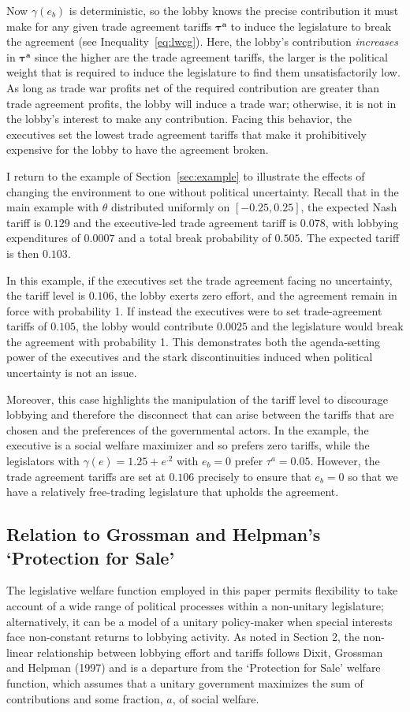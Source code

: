 \documentclass[10pt]{article}
\newcommand{\ve}{\theta}
\newcommand{\bta}{\bm{\tau^a}}
\newcommand{\ga}{\gamma}
\begin{document}
Now $\ga(e_b)$ is deterministic, so the lobby knows the precise contribution it must make for any given trade agreement tariffs $\bta$ to induce the legislature to break the agreement (see Inequality~\ref{eq:lwcg}). Here, the lobby's contribution \textit{increases} in $\bta$ since the higher are the trade agreement tariffs, the larger is the political weight that is required to induce the legislature to find them unsatisfactorily low. As long as trade war profits net of the required contribution are greater than trade agreement profits, the lobby will induce a trade war; otherwise, it is not in the lobby's interest to make any contribution. Facing this behavior, the executives set the lowest trade agreement tariffs that make it prohibitively expensive for the lobby to have the agreement broken.

I return to the example of Section~\ref{sec:example} to illustrate the effects of changing the environment to one without political uncertainty. Recall that in the main example with $\ve$ distributed uniformly on $[-0.25,0.25]$, the expected Nash tariff is $0.129$ and the executive-led trade agreement tariff is $0.078$, with lobbying expenditures of $0.0007$ and a total break probability of $0.505$. The expected tariff is then $0.103$.

In this example, if the executives set the trade agreement facing no uncertainty, the tariff level is $0.106$, the lobby exerts zero effort, and the agreement remain in force with probability 1. If instead the executives were to set trade-agreement tariffs of $0.105$, the lobby would contribute $0.0025$ and the legislature would break the agreement with probability 1. This demonstrates both the agenda-setting power of the executives and the stark discontinuities induced when political uncertainty is not an issue.

Moreover, this case highlights the manipulation of the tariff level to discourage lobbying and therefore the disconnect that can arise between the tariffs that are chosen and the preferences of the governmental actors. In the example, the executive is a social welfare maximizer and so prefers zero tariffs, while the legislators with $\ga(e) = 1.25 + e^{.2}$ with $e_b = 0$ prefer $\tau^a = 0.05$. However, the trade agreement tariffs are set at $0.106$ precisely to ensure that $e_b =0$ so that we have a relatively free-trading legislature that upholds the agreement.


\subsection{Relation to Grossman and Helpman's `Protection for Sale'}
\label{sec:gh}
The legislative welfare function employed in this paper permits flexibility to take account of a wide range of political processes within a non-unitary legislature; alternatively, it can be a model of a unitary policy-maker when special interests face non-constant returns to lobbying activity. As noted in Section 2, the non-linear relationship between lobbying effort and tariffs follows Dixit, Grossman and Helpman (1997) and is a departure from the `Protection for Sale' welfare function, which assumes that a unitary government maximizes the sum of contributions and some fraction, $a$, of social welfare.
\end{document}
